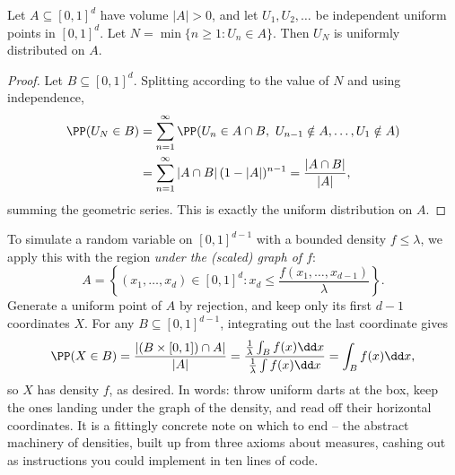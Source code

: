 \begin{theorem}
	Let $A \subseteq [0, 1]^d$ have volume $|A| > 0$, and let $U_1, U_2, \dots$ be independent uniform points in $[0,1]^d$. Let $N = \min\{n \geq 1 : U_n \in A\}$. Then $U_N$ is uniformly distributed on $A$.
\end{theorem}
\begin{proof}
	Let $B \subseteq [0,1]^d$. Splitting according to the value of $N$ and using independence,
	\begin{align*}
		\PP(U_N \in B) &= \sum_{n = 1}^{\infty} \PP(U_n \in A \cap B,\ U_{n-1} \notin A, \dots, U_1 \notin A) \\
		&= \sum_{n = 1}^{\infty} |A \cap B| \, (1 - |A|)^{n - 1} = \frac{|A \cap B|}{|A|},
	\end{align*}
	summing the geometric series. This is exactly the uniform distribution on $A$.
\end{proof}

To simulate a random variable on $[0,1]^{d-1}$ with a bounded density $f \leq \lambda$, we apply this with the region \emph{under the (scaled) graph of $f$}:
$$
A = \left\{(x_1, \dots, x_d) \in [0,1]^d : x_d \leq \frac{f(x_1, \dots, x_{d-1})}{\lambda}\right\}.
$$
Generate a uniform point of $A$ by rejection, and keep only its first $d - 1$ coordinates $X$. For any $B \subseteq [0,1]^{d - 1}$, integrating out the last coordinate gives
$$
\PP(X \in B) = \frac{|(B \times [0,1]) \cap A|}{|A|} = \frac{\frac{1}{\lambda}\int_B f(x)\dd x}{\frac{1}{\lambda}\int f(x) \dd x} = \int_B f(x)\dd x,
$$
so $X$ has density $f$, as desired. In words: throw uniform darts at the box, keep the ones landing under the graph of the density, and read off their horizontal coordinates. It is a fittingly concrete note on which to end -- the abstract machinery of densities, built up from three axioms about measures, cashing out as instructions you could implement in ten lines of code.


